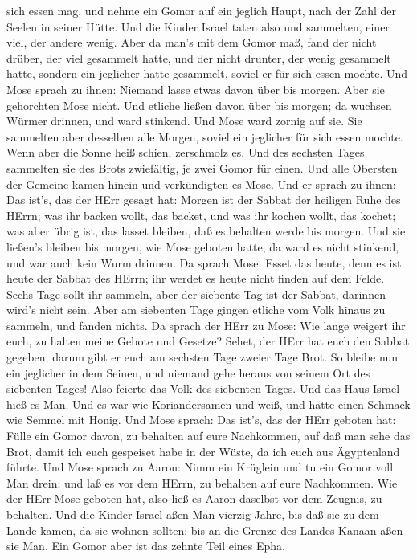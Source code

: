 sich essen mag, und nehme ein Gomor auf ein jeglich Haupt, nach der Zahl
der Seelen in seiner Hütte.  Und die Kinder Israel taten
also und sammelten, einer viel, der andere wenig.  Aber da
man's mit dem Gomor maß, fand der nicht drüber, der viel gesammelt
hatte, und der nicht drunter, der wenig gesammelt hatte, sondern ein
jeglicher hatte gesammelt, soviel er für sich essen mochte.
 Und Mose sprach zu ihnen: Niemand lasse etwas davon über
bis morgen.  Aber sie gehorchten Mose nicht. Und etliche
ließen davon über bis morgen; da wuchsen Würmer drinnen, und ward
stinkend. Und Mose ward zornig auf sie.  Sie sammelten aber
desselben alle Morgen, soviel ein jeglicher für sich essen mochte. Wenn
aber die Sonne heiß schien, zerschmolz es.  Und des
sechsten Tages sammelten sie des Brots zwiefältig, je zwei Gomor für
einen. Und alle Obersten der Gemeine kamen hinein und verkündigten es
Mose.  Und er sprach zu ihnen: Das ist's, das der HErr
gesagt hat: Morgen ist der Sabbat der heiligen Ruhe des HErrn; was ihr
backen wollt, das backet, und was ihr kochen wollt, das kochet; was aber
übrig ist, das lasset bleiben, daß es behalten werde bis morgen.
 Und sie ließen's bleiben bis morgen, wie Mose geboten
hatte; da ward es nicht stinkend, und war auch kein Wurm drinnen.
 Da sprach Mose: Esset das heute, denn es ist heute der
Sabbat des HErrn; ihr werdet es heute nicht finden auf dem Felde.
 Sechs Tage sollt ihr sammeln, aber der siebente Tag ist
der Sabbat, darinnen wird's nicht sein.  Aber am siebenten
Tage gingen etliche vom Volk hinaus zu sammeln, und fanden nichts.
 Da sprach der HErr zu Mose: Wie lange weigert ihr euch, zu
halten meine Gebote und Gesetze?  Sehet, der HErr hat euch
den Sabbat gegeben; darum gibt er euch am sechsten Tage zweier Tage
Brot. So bleibe nun ein jeglicher in dem Seinen, und niemand gehe heraus
von seinem Ort des siebenten Tages!  Also feierte das Volk
des siebenten Tages.  Und das Haus Israel hieß es Man. Und
es war wie Koriandersamen und weiß, und hatte einen Schmack wie Semmel
mit Honig.  Und Mose sprach: Das ist's, das der HErr
geboten hat: Fülle ein Gomor davon, zu behalten auf eure Nachkommen, auf
daß man sehe das Brot, damit ich euch gespeiset habe in der Wüste, da
ich euch aus Ägyptenland führte.  Und Mose sprach zu Aaron:
Nimm ein Krüglein und tu ein Gomor voll Man drein; und laß es vor dem
HErrn, zu behalten auf eure Nachkommen.  Wie der HErr Mose
geboten hat, also ließ es Aaron daselbst vor dem Zeugnis, zu behalten.
 Und die Kinder Israel aßen Man vierzig Jahre, bis daß sie
zu dem Lande kamen, da sie wohnen sollten; bis an die Grenze des Landes
Kanaan aßen sie Man.  Ein Gomor aber ist das zehnte Teil
eines Epha.

